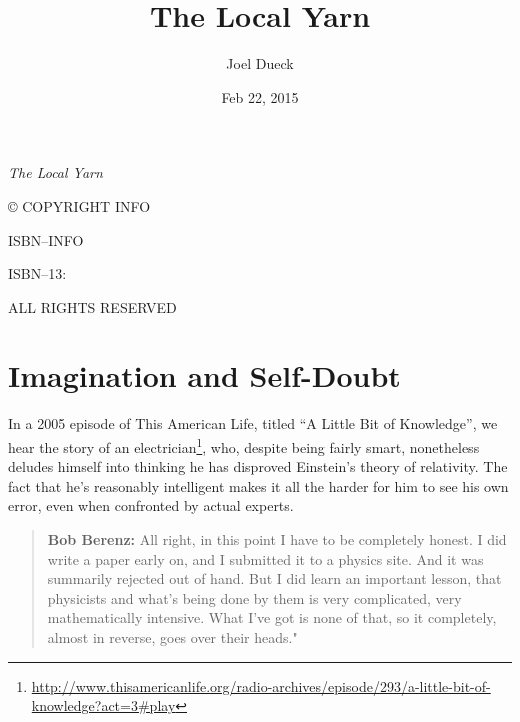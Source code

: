 \documentclass[english,showtrims, 10pt]{memoir}
\title{The Local Yarn}
\author{Joel Dueck}
\date{Feb 22, 2015}
\makeatletter
\renewcommand{\href}[2]{#2\footnote{\raggedright\url{#1}}}
\newcommand{\setChapterDescription}[1]{%
   \def\chapterDesc{#1}%
}
\def\chapterDesc{}
\newcommand{\ChapterDate}[2]{
	\setChapterDescription{#2}
	\chapter{#1}
	\setChapterDescription{}
}
\def\maketitle{%
  \null
  \thispagestyle{empty}%
  \vfill
  \begin{center}\leavevmode
    \normalfont
    {\LARGE\raggedleft \@author\par}%
    \hrulefill\par
    {\huge\raggedright \@title\par}%
    \vskip 1cm
  \end{center}%
  \vfill
  \null
  \cleardoublepage
  }
\makeatother
\begin{document}
 


 \maketitle  

\frontmatter

\null\vfill

\begin{flushleft}
 \textit{The Local Yarn} 


© \textsc{COPYRIGHT INFO}


ISBN--INFO

ISBN--13: 
\bigskip





\textsc{ALL RIGHTS RESERVED}




\end{flushleft}

 

\cleardoublepage
\begin{KeepFromToc}
  \tableofcontents
\end{KeepFromToc}

\mainmatter
\pagestyle{simple}

\ChapterDate{Imagination and Self-Doubt}{July 18, 2014}

{In a} 2005 episode of This American Life, titled ``A Little Bit of
Knowledge'',
\href{http://www.thisamericanlife.org/radio-archives/episode/293/a-little-bit-of-knowledge?act=3\#play}{we
hear the story of an electrician}, who, despite being fairly smart,
nonetheless deludes himself into thinking he has disproved Einstein's
theory of relativity. The fact that he's reasonably intelligent makes it
all the harder for him to see his own error, even when confronted by
actual experts.

\begin{quote}
\textbf{Bob Berenz:} All right, in this point I have to be completely
honest. I did write a paper early on, and I submitted it to a physics
site. And it was summarily rejected out of hand. But I did learn an
important lesson, that physicists and what's being done by them is very
complicated, very mathematically intensive. What I've got is none of
that, so it completely, almost in reverse, goes over their heads."
\end{quote}
\end{document}
